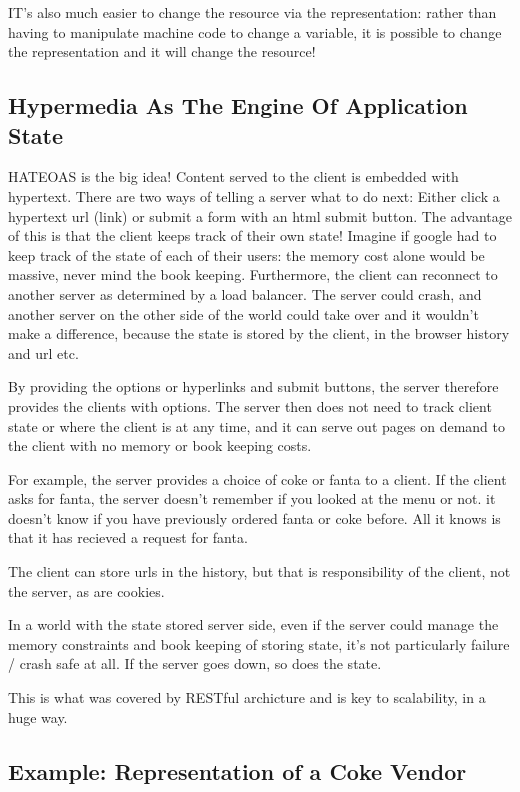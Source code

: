 \documentclass[11pt]{article}
\begin{document}
IT's also much easier to change the resource via the representation: rather than having to manipulate machine code to change a variable, it is possible to change the representation and it will change the resource!

\subsection{Hypermedia As The Engine Of Application State} 

HATEOAS is the big idea! Content served to the client is embedded with hypertext. There are two ways of telling a server what to do next: Either click a hypertext url (link) or submit a form with an html submit button. The advantage of this is that the client keeps track of their own state! Imagine if google had to keep track of the state of each of their users: the memory cost alone would be massive, never mind the book keeping. Furthermore, the client can reconnect to another server as determined by a load balancer. The server could crash, and another server on the other side of the world could take over and it wouldn’t make a difference, because the state is stored by the client, in the browser history and url etc.

By providing the options or hyperlinks and submit buttons, the server therefore provides the clients with options. The server then does not need to track client state or where the client is at any time, and it can serve out pages on demand to the client with no memory or book keeping costs.

For example, the server provides a choice of coke or fanta to a client. If the client asks for fanta, the server doesn’t remember if you looked at the menu or not. it doesn't know if you have previously ordered fanta or coke before. All it knows is that it has recieved a request for fanta.

The client can store urls in the history, but that is responsibility of the client, not the server, as are cookies.

In a world with the state stored server side, even if the server could manage the memory constraints and book keeping of storing state, it’s not particularly failure / crash safe at all. If the server goes down, so does the state.

This is what was covered by RESTful archicture and is key to scalability, in a huge way.

\subsection{Example: Representation of a  Coke Vendor}
\end{document}
